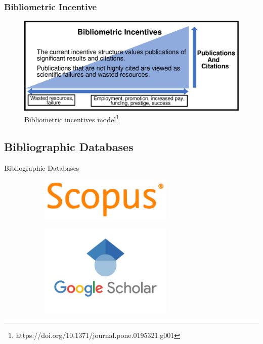 \documentclass{beamer}
\begin{document}
\begin{frame}
    \frametitle{Bibliometric Incentive}

    \begin{figure}[h]
        \includegraphics[height=0.55\textheight]{bib_incentives.png}
        \caption{Bibliometric incentives model\footnote{https://doi.org/10.1371/journal.pone.0195321.g001}}
    \end{figure}

\end{frame}
\subsection{Bibliographic Databases}
\begin{frame}
    \begin{center}
        {\huge Bibliographic Databases}
    \end{center}
    \begin{figure}[h]
        \begin{subfigure}{0.49\textwidth}
            \centering
            \includegraphics[width=0.7\textwidth]{scopus.png}
        \end{subfigure}
        \begin{subfigure}{0.49\textwidth}
            \centering
            \includegraphics[width=0.7\textwidth]{gs.png}
        \end{subfigure}
    \end{figure}
\end{frame}
\end{document}
